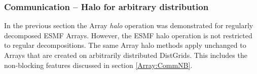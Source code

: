  
\setlength{\oldparskip}{\parskip}
\setlength{\parskip}{1.5ex}
\setlength{\oldparindent}{\parindent}
\setlength{\parindent}{0pt}
\setlength{\oldbaselineskip}{\baselineskip}
\setlength{\baselineskip}{11pt}
 
\def\bv{\begin{verbatim}}
\def\ev{\end{verbatim}}
\def\be{\begin{equation}}
\def\ee{\end{equation}}
\def\bea{\begin{eqnarray}}
\def\eea{\end{eqnarray}}
\def\bi{\begin{itemize}}
\def\ei{\end{itemize}}
\def\bn{\begin{enumerate}}
\def\en{\end{enumerate}}
\def\bd{\begin{description}}
\def\ed{\end{description}}
\def\({\left (}
\def\){\right )}
\def\[{\left [}
\def\]{\right ]}
\def\<{\left  \langle}
\def\>{\right \rangle}
\def\cI{{\cal I}}
\def\diag{\mathop{\rm diag}}
\def\tr{\mathop{\rm tr}}


 

  
   \subsubsection{Communication -- Halo for arbitrary distribution}
   \label{Array:ArbHalo}
  
   In the previous section the Array {\em halo} operation was demonstrated 
   for regularly decomposed ESMF Arrays. However, the ESMF halo operation
   is not restricted to regular decompositions. The same Array halo methods
   apply unchanged to Arrays that are created on arbitrarily distributed
   DistGrids. This includes the non-blocking features discussed in section
   \ref{Array:CommNB}.
  
